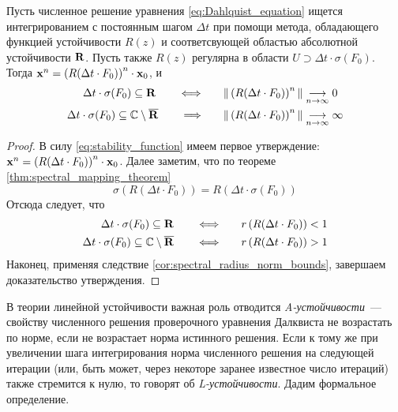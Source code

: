 \begin{statement}
    \label{stat:linear_numerical_stability}
    Пусть численное решение уравнения \eqref{eq:Dahlquist_equation} ищется интегрированием с постоянным шагом $ \Delta t $
    при помощи метода, обладающего функцией устойчивости $ R(z) $ и соответсвующей областью абсолютной устойчивости $ \mathbf{R} $.
    Пусть также $ R(z) $ регулярна в области $ U \supset \Delta t \cdot \sigma(F_0) $.
    Тогда $ \mathbf{x}^n = \left( R(\Delta t \cdot F_0) \right)^n \cdot \mathbf{x}_0 $, и
    \begin{align}
        \Delta t \cdot \sigma(F_0) \subseteq \mathbf{R} \qquad \Longleftrightarrow \qquad & \| \left( R(\Delta t \cdot F_0) \right)^n \| \underset{n \to \infty}{\longrightarrow} 0 \\
        \Delta t \cdot \sigma(F_0) \subseteq \mathbb{C} \setminus \overline{\mathbf{R}} \qquad \Longrightarrow \qquad & \| \left( R(\Delta t \cdot F_0) \right)^n \| \underset{n \to \infty}{\longrightarrow} \infty
    \end{align}
\end{statement}

\begin{proof}
    В силу \eqref{eq:stability_function} имеем первое утверждение: $ \mathbf{x}^n = \left( R(\Delta t \cdot F_0) \right)^n \cdot \mathbf{x}_0 $.
    Далее заметим, что по теореме \ref{thm:spectral_mapping_theorem}
    \[
        \sigma\left( R(\Delta t \cdot F_0) \right) = R\left( \Delta t \cdot \sigma(F_0) \right)
    \]
    Отсюда следует, что
    \begin{align}
        \Delta t \cdot \sigma(F_0) \subseteq \mathbf{R} \qquad \Longleftrightarrow \qquad & r\left( R(\Delta t \cdot F_0) \right) < 1 \\
        \Delta t \cdot \sigma(F_0) \subseteq \mathbb{C} \setminus \overline{\mathbf{R}} \qquad \Longleftrightarrow \qquad & r\left( R(\Delta t \cdot F_0) \right) > 1
    \end{align}
    Наконец, применяя следствие \ref{cor:spectral_radius_norm_bounds}, завершаем доказательство утверждения.
\end{proof}

В теории линейной устойчивости важная роль отводится \emph{A-устойчивости}~--- свойству численного решения проверочного уравнения Далквиста не возрастать по норме,
если не возрастает норма истинного решения.
Если к тому же при увеличении шага интегрирования норма численного решения на следующей итерации (или, быть может, через некоторе заранее известное число итераций)
также стремится к нулю, то говорят об \emph{L-устойчивости}.
Дадим формальное определение.

